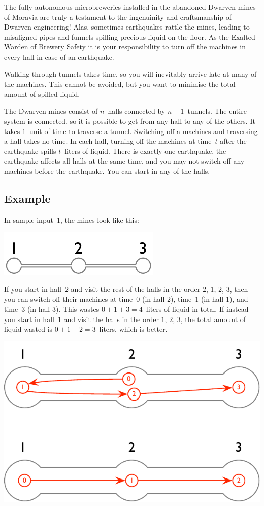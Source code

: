 
\noindent
The fully autonomous microbreweries installed in the abandoned Dwarven mines of Moravia are truly a testament to the ingenuinity and craftsmanship of Dwarven engineering!
Alas, sometimes earthquakes rattle the mines, leading to misaligned pipes and funnels spilling precious liquid on the floor.
As the Exalted Warden of Brewery Safety it is your responsibility to turn off the machines in every hall in case of an earthquake.

Walking through tunnels takes time, 
so you will inevitably arrive late at many of the machines.
This cannot be avoided, but you want to minimise the total amount of spilled liquid.

\medskip
The Dwarven mines consist of $n$~halls connected by $n-1$~tunnels.
The entire system is connected, so it is possible to get from any hall to any of the others.
It takes $1$~unit of time to traverse a tunnel.
Switching off a machines and traversing a hall takes no time.
In each hall, turning off the machines at time~$t$ after the earthquake spills $t$~liters of liquid.
There is exactly one earthquake, the earthquake affects all halls at the same time, and you may not switch off any machines before the earthquake.
You can start in any of the halls.

\subsection*{Example}

In sample input~$1$, the mines look like this:

\includegraphics[width=.2\textwidth]{img/sample-1.pdf}

If you start in hall~$2$ and visit the rest of the halls in the order $2$, $1$, $2$, $3$, then you can switch off their machines at time~$0$ (in hall $2$), time~$1$ (in hall $1$), and time~$3$ (in hall $3$).
This wastes $0+1+3=4$~liters of liquid in total.
If instead you start in hall~$1$ and visit the halls in the order $1$, $2$, $3$, the total amount of liquid wasted is $0+1+2=3$~liters, which is better.

\includegraphics[width=.4\textwidth]{img/sample-1-ans.pdf}

